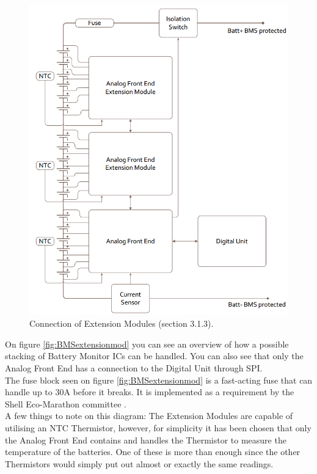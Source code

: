 \begin{figure}[H]
	\centering
	\includegraphics[width=1.0\linewidth]{Hardware/Pictures/BMSextensionmod}
	\caption[Empty]{Connection of Extension Modules \cite{BMSDocumentation} (section 3.1.3).}
	\label{fig:BMSextensionmod}
\end{figure}

On figure \vref{fig:BMSextensionmod} you can see an overview of how a possible stacking of Battery Monitor ICs can be handled. You can also see that only the Analog Front End has a connection to the Digital Unit through SPI.\\
The fuse block seen on figure \vref{fig:BMSextensionmod} is a fast-acting fuse that can handle up to 30A before it breaks. It is implemented as a requirement by the Shell Eco-Marathon committee \cite{ShellRequirements}.\\
A few things to note on this diagram: The Extension Modules are capable of utilising an NTC Thermistor, however, for simplicity it has been chosen that only the Analog Front End contains and handles the Thermistor to measure the temperature of the batteries. One of these is more than enough since the other Thermistors would simply put out almost or exactly the same readings.

